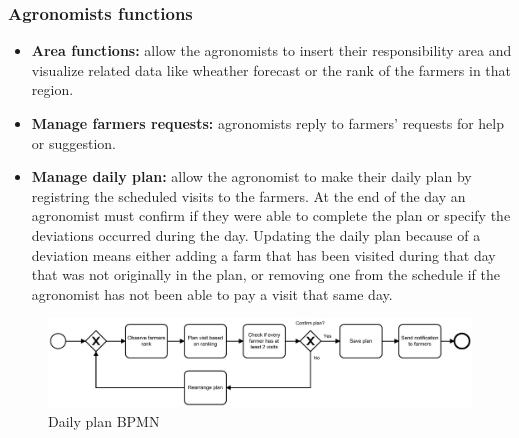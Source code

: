 \documentclass[table, 12pt]{article}
\begin{document}
\subsubsection{Agronomists functions}
\begin{itemize}
    \item \textbf{Area functions:} allow the agronomists to insert their responsibility area and visualize related data like wheather forecast or the rank of the farmers in that region.
    \item \textbf{Manage farmers requests:} agronomists reply to farmers' requests for help or suggestion.
    \item \textbf{Manage daily plan:} allow the agronomist to make their daily plan by registring the scheduled visits to the farmers. At the end of the day an agronomist must confirm if they were able to complete the plan or specify the deviations occurred during the day. Updating the daily plan because of a deviation means either adding a farm that has been visited during that day that was not originally in the plan, or removing one from the schedule if the agronomist has not been able to pay a visit that same day.  
\end{itemize}
\begin{center}
    \begin{figure}[H]
        \includegraphics[width=\textwidth]{assets/BPMN/DailyPlanBpmn}
        \caption{Daily plan BPMN}
        \label{fig: dailyplan}
    \end{figure}
\end{center}
\end{document}

